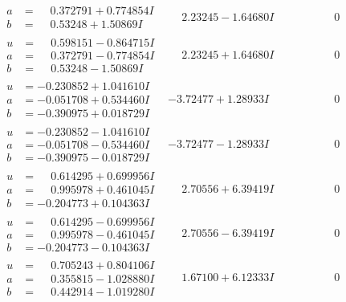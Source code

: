 \documentclass[1p]{elsarticle_modified}
\theoremstyle{definition}
\begin{document}
$$\begin{array}{c|c|c}
\begin{aligned}
a &= \phantom{-}0.372791 + 0.774854 I \\
b &= \phantom{-}0.53248 + 1.50869 I\end{aligned}
 & \phantom{-}2.23245 - 1.64680 I & \phantom{-0.000000 } 0 \\ \hline\begin{aligned}
u &= \phantom{-}0.598151 - 0.864715 I \\
a &= \phantom{-}0.372791 - 0.774854 I \\
b &= \phantom{-}0.53248 - 1.50869 I\end{aligned}
 & \phantom{-}2.23245 + 1.64680 I & \phantom{-0.000000 } 0 \\ \hline\begin{aligned}
u &= -0.230852 + 1.041610 I \\
a &= -0.051708 + 0.534460 I \\
b &= -0.390975 + 0.018729 I\end{aligned}
 & -3.72477 + 1.28933 I & \phantom{-0.000000 } 0 \\ \hline\begin{aligned}
u &= -0.230852 - 1.041610 I \\
a &= -0.051708 - 0.534460 I \\
b &= -0.390975 - 0.018729 I\end{aligned}
 & -3.72477 - 1.28933 I & \phantom{-0.000000 } 0 \\ \hline\begin{aligned}
u &= \phantom{-}0.614295 + 0.699956 I \\
a &= \phantom{-}0.995978 + 0.461045 I \\
b &= -0.204773 + 0.104363 I\end{aligned}
 & \phantom{-}2.70556 + 6.39419 I & \phantom{-0.000000 } 0 \\ \hline\begin{aligned}
u &= \phantom{-}0.614295 - 0.699956 I \\
a &= \phantom{-}0.995978 - 0.461045 I \\
b &= -0.204773 - 0.104363 I\end{aligned}
 & \phantom{-}2.70556 - 6.39419 I & \phantom{-0.000000 } 0 \\ \hline\begin{aligned}
u &= \phantom{-}0.705243 + 0.804106 I \\
a &= \phantom{-}0.355815 - 1.028880 I \\
b &= \phantom{-}0.442914 - 1.019280 I\end{aligned}
 & \phantom{-}1.67100 + 6.12333 I & \phantom{-0.000000 } 0 \\ \hline\begin{aligned}

\end{aligned}
\end{array}$$
\end{document}
